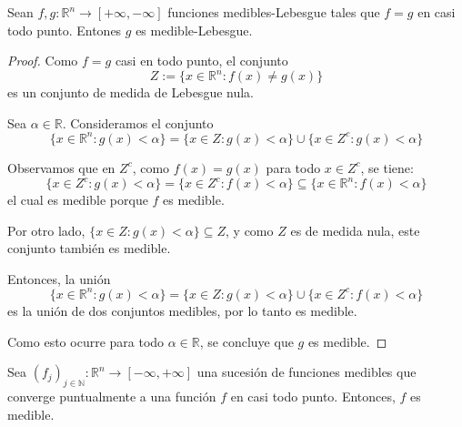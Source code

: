 \begin{proposición}
Sean $f, g: \mathbb{R}^n \to [+\infty, -\infty]$ funciones medibles-Lebesgue tales que $f = g$ en casi todo punto. Entones $g$ es medible-Lebesgue.
\end{proposición}

\begin{proof}
    Como $f = g$ casi en todo punto, el conjunto
    \[
        Z := \{x \in \mathbb{R}^n : f(x) \neq g(x)\}
    \]
    es un conjunto de medida de Lebesgue nula.

    Sea $\alpha \in \mathbb{R}$. Consideramos el conjunto
    \[
        \{x \in \mathbb{R}^n : g(x) < \alpha\} = \{x \in Z : g(x) < \alpha\} \cup \{x \in Z^c : g(x) < \alpha\}
    \]

    Observamos que en $Z^c$, como $f(x) = g(x)$ para todo $x \in Z^c$, se tiene:
    \[
        \{x \in Z^c : g(x) < \alpha\} = \{x \in Z^c : f(x) < \alpha\} \subseteq \{x \in \mathbb{R}^n : f(x) < \alpha\}
    \]
    el cual es medible porque $f$ es medible.

    Por otro lado, $\{x \in Z : g(x) < \alpha\} \subseteq Z$, y como $Z$ es de
    medida nula, este conjunto también es medible.

    Entonces, la unión
    \[
        \{x \in \mathbb{R}^n : g(x) < \alpha\} = \{x \in Z : g(x) < \alpha\} \cup \{x \in Z^c : f(x) < \alpha\}
    \]
    es la unión de dos conjuntos medibles, por lo tanto es medible.

    Como esto ocurre para todo $\alpha \in \mathbb{R}$, se concluye que $g$ es
    medible.
\end{proof}

\begin{corolario}
    Sea $(f_j)_{j \in \mathbb{N}}: \mathbb{R}^n \to [-\infty, +\infty]$ una sucesión de funciones medibles que converge puntualmente a una función $f$ en casi todo punto. Entonces, $f$ es medible.
\end{corolario}

